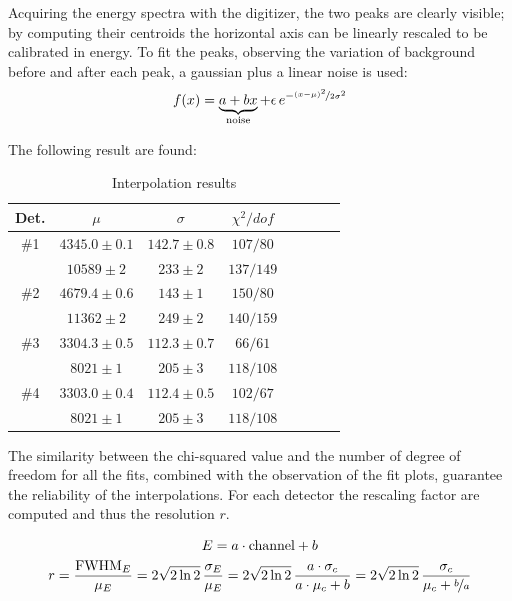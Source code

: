 \documentclass[11pt,a4 paper]{article}
\let\oldfrac\frac
\renewcommand{\frac}[3][d]{\ifthenelse{\equal{#1}{d}}{\oldfrac{#2}{#3}}{\nicefrac{#2}{#3}}}
\begin{document}
Acquiring the energy spectra with the digitizer, the two peaks are clearly visible; by computing their centroids the horizontal axis can be linearly rescaled to be calibrated in energy. To fit the peaks, observing the variation of background before and after each peak, a gaussian plus a linear noise is used:
\begin{equation*}
    f(x) = \underbrace{a + bx}_\text{noise} + \epsilon\, e^{-\frac[f]{(x-\mu)^2}{2\sigma^2}}
\end{equation*}

The following result are found:
\begin{table}[H]
    \centering
    \begin{tabular}{cccccccc}
        \toprule
        Det. & $\mu$ & $\sigma$ & $\chi^2/dof$ \\
        \midrule
        \#1 & $4345.0 \pm 0.1$ & $142.7 \pm 0.8$ & $107/80$ \\
        & $10589 \pm 2$ & $233 \pm 2$ & $137/149$ \\
        \#2 & $4679.4 \pm 0.6$ & $143 \pm 1$ & $150/80$ \\
        & $11362 \pm 2$ & $249 \pm 2$ & $140/159$ \\
        \#3 & $3304.3\pm0.5$ & $112.3\pm 0.7$ & $66/61$ \\
        & $8021\pm 1$ & $205\pm3$ & $118/108$ \\
        \#4 & $3303.0\pm0.4$ & $112.4\pm0.5$ & $102/67$ \\
        & $8021\pm1$ & $205\pm3$ & $118/108$\\
        \bottomrule
    \end{tabular}
    \caption{Interpolation results}
    \label{tab:calibr1}
\end{table}

The similarity between the chi-squared value and the number of degree of freedom for all the fits, combined with the observation of the fit plots, guarantee the reliability of the interpolations. For each detector the rescaling factor are computed and thus the resolution $r$.

\begin{gather*}
    E = a \cdot \text{channel} + b \\
    r = \frac{\text{FWHM}_E}{\mu_E} = 2\sqrt{2\ln2} \,\frac{\sigma_E}{\mu_E} = 2\sqrt{2\ln2}\, \frac{a \cdot \sigma_c}{a \cdot \mu_c + b} = 2\sqrt{2\ln2} \,\frac{\sigma_c}{\mu_c + \frac[f]{b}{a}}
\end{gather*}

\end{document}
